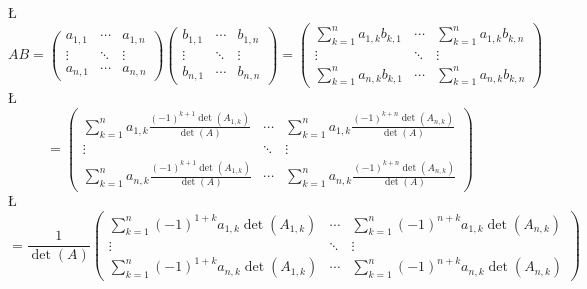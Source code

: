 \documentclass[english,hebrew]{article}
\begin{document}
\L{%
\[
AB=\begin{pmatrix}a_{1,1} & \cdots & a_{1,n}\\
\vdots & \ddots & \vdots\\
a_{n,1} & \cdots & a_{n,n}
\end{pmatrix}\begin{pmatrix}b_{1,1} & \cdots & b_{1,n}\\
\vdots & \ddots & \vdots\\
b_{n,1} & \cdots & b_{n,n}
\end{pmatrix}=\begin{pmatrix}\sum_{k=1}^{n}a_{1,k}b_{k,1} & \cdots & \sum_{k=1}^{n}a_{1,k}b_{k,n}\\
\vdots & \ddots & \vdots\\
\sum_{k=1}^{n}a_{n,k}b_{k,1} & \cdots & \sum_{k=1}^{n}a_{n,k}b_{k,n}
\end{pmatrix}
\]
}%
\L{%
\[
=\begin{pmatrix}\sum_{k=1}^{n}a_{1,k}\frac{\left(-1\right)^{k+1}\det\left(A_{1,k}\right)}{\det(A)} & \cdots & \sum_{k=1}^{n}a_{1,k}\frac{\left(-1\right)^{k+n}\det\left(A_{n,k}\right)}{\det(A)}\\
\vdots & \ddots & \vdots\\
\sum_{k=1}^{n}a_{n,k}\frac{\left(-1\right)^{k+1}\det\left(A_{1,k}\right)}{\det(A)} & \cdots & \sum_{k=1}^{n}a_{n,k}\frac{\left(-1\right)^{k+n}\det\left(A_{n,k}\right)}{\det(A)}
\end{pmatrix}
\]
}%
\L{%
\[
=\frac{1}{\det(A)}\begin{pmatrix}\sum_{k=1}^{n}\left(-1\right)^{1+k}a_{1,k}\det\left(A_{1,k}\right) & \cdots & \sum_{k=1}^{n}\left(-1\right)^{n+k}a_{1,k}\det\left(A_{n,k}\right)\\
\vdots & \ddots & \vdots\\
\sum_{k=1}^{n}\left(-1\right)^{1+k}a_{n,k}\det\left(A_{1,k}\right) & \cdots & \sum_{k=1}^{n}\left(-1\right)^{n+k}a_{n,k}\det\left(A_{n,k}\right)
\end{pmatrix}
\]
}%
\end{document}
